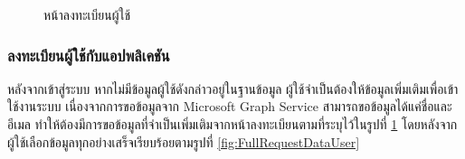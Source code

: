 \documentclass[14pt,oneside,openright,a4paper]{cpe-thai-project}
\begin{document}
 \begin{figure}[H]\centering
  \setlength{\fboxrule}{0.5mm}
  \setlength{\fboxsep}{0.5cm}
  \caption{หน้าลงทะเบียนผู้ใช้}\label{fig:RequestDataUser}
 \end{figure}
 
 \subsubsection{ลงทะเบียนผู้ใช้กับแอปพลิเคชัน} 
 หลังจากเข้าสู่ระบบ หากไม่มีข้อมูลผู้ใช้ดังกล่าวอยู่ในฐานข้อมูล ผู้ใช้จำเป็นต้องให้ข้อมูลเพิ่มเติมเพื่อเข้าใช้งานระบบ เนื่องจากการขอข้อมูลจาก Microsoft Graph Service 
 สามารถขอข้อมูลได้แค่ชื่อและอีเมล ทำให้ต้องมีการขอข้อมูลที่จำเป็นเพิ่มเติมจากหน้าลงทะเบียนตามที่ระบุไว้ในรูปที่  \ref{fig:RequestDataUser} 
โดยหลังจากผู้ใช้เลือกข้อมูลทุกอย่างเสร็จเรียบร้อยตามรูปที่ \ref{fig:FullRequestDataUser}
\end{document}
